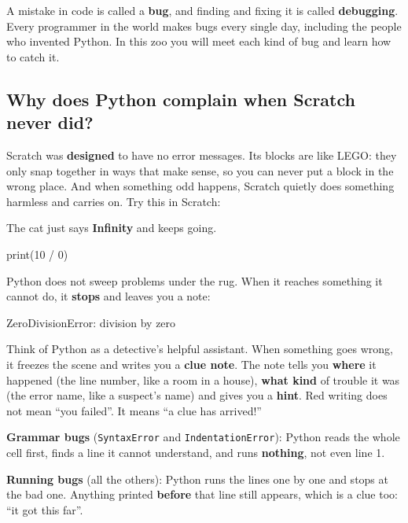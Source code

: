 A mistake in code is called a \textbf{bug}, and finding and fixing it is called \textbf{debugging}. Every programmer in the world makes bugs every single day, including the people who invented Python. In this zoo you will meet each kind of bug and learn how to catch it.

\subsection*{Why does Python complain when Scratch never did?}

Scratch was \textbf{designed} to have no error messages. Its blocks are like LEGO: they only snap together in ways that make sense, so you can never put a block in the wrong place. And when something odd happens, Scratch quietly does something harmless and carries on. Try this in Scratch:

\begin{tcbraster}[raster columns=2, raster equal height=rows, raster column skip=12pt, raster valign=center]
\begin{tcolorbox}[colback=white, colframe=white, boxrule=0pt, valign=center]
\begin{scratch}
\end{scratch}
\par\smallskip\small The cat just says \textbf{Infinity} and keeps going.
\end{tcolorbox}
\begin{code}
print(10 / 0)
\end{code}
\end{tcbraster}

Python does not sweep problems under the rug. When it reaches something it cannot do, it \textbf{stops} and leaves you a note:

\begin{bzerror}
ZeroDivisionError: division by zero
\end{bzerror}

Think of Python as a detective's helpful assistant. When something goes wrong, it freezes the scene and writes you a \textbf{clue note}. The note tells you \textbf{where} it happened (the line number, like a room in a house), \textbf{what kind} of trouble it was (the error name, like a suspect's name) and gives you a \textbf{hint}. Red writing does not mean ``you failed''. It means ``a clue has arrived!''

\begin{think}
\textbf{Grammar bugs} (\texttt{SyntaxError} and \texttt{IndentationError}): Python reads the whole cell first, finds a line it cannot understand, and runs \textbf{nothing}, not even line 1.

\textbf{Running bugs} (all the others): Python runs the lines one by one and stops at the bad one. Anything printed \textbf{before} that line still appears, which is a clue too: ``it got this far''.
\end{think}

